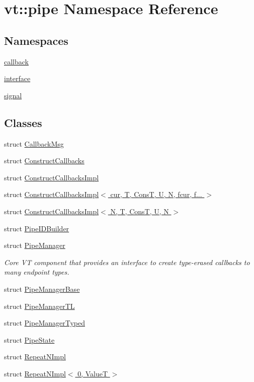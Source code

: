 \hypertarget{namespacevt_1_1pipe}{}\section{vt\+:\+:pipe Namespace Reference}
\label{namespacevt_1_1pipe}
\subsection*{Namespaces}
\begin{DoxyCompactItemize}
\item 
 \hyperlink{namespacevt_1_1pipe_1_1callback}{callback}
\item 
 \hyperlink{namespacevt_1_1pipe_1_1interface}{interface}
\item 
 \hyperlink{namespacevt_1_1pipe_1_1signal}{signal}
\end{DoxyCompactItemize}
\subsection*{Classes}
\begin{DoxyCompactItemize}
\item 
struct \hyperlink{structvt_1_1pipe_1_1_callback_msg}{Callback\+Msg}
\item 
struct \hyperlink{structvt_1_1pipe_1_1_construct_callbacks}{Construct\+Callbacks}
\item 
struct \hyperlink{structvt_1_1pipe_1_1_construct_callbacks_impl}{Construct\+Callbacks\+Impl}
\item 
struct \hyperlink{structvt_1_1pipe_1_1_construct_callbacks_impl_3_01cur_00_01_t_00_01_cons_t_00_01_u_00_01_n_00_01fcur_00_01f_8_8_8_01_4}{Construct\+Callbacks\+Impl$<$ cur, T, Cons\+T, U, N, fcur, f... $>$}
\item 
struct \hyperlink{structvt_1_1pipe_1_1_construct_callbacks_impl_3_01_n_00_01_t_00_01_cons_t_00_01_u_00_01_n_01_4}{Construct\+Callbacks\+Impl$<$ N, T, Cons\+T, U, N $>$}
\item 
struct \hyperlink{structvt_1_1pipe_1_1_pipe_i_d_builder}{Pipe\+I\+D\+Builder}
\item 
struct \hyperlink{structvt_1_1pipe_1_1_pipe_manager}{Pipe\+Manager}
\begin{DoxyCompactList}\small\item\em Core VT component that provides an interface to create type-\/erased callbacks to many endpoint types. \end{DoxyCompactList}\item 
struct \hyperlink{structvt_1_1pipe_1_1_pipe_manager_base}{Pipe\+Manager\+Base}
\item 
struct \hyperlink{structvt_1_1pipe_1_1_pipe_manager_t_l}{Pipe\+Manager\+TL}
\item 
struct \hyperlink{structvt_1_1pipe_1_1_pipe_manager_typed}{Pipe\+Manager\+Typed}
\item 
struct \hyperlink{structvt_1_1pipe_1_1_pipe_state}{Pipe\+State}
\item 
struct \hyperlink{structvt_1_1pipe_1_1_repeat_n_impl}{Repeat\+N\+Impl}
\item 
struct \hyperlink{structvt_1_1pipe_1_1_repeat_n_impl_3_010_00_01_value_t_01_4}{Repeat\+N\+Impl$<$ 0, Value\+T $>$}
\end{DoxyCompactItemize}
